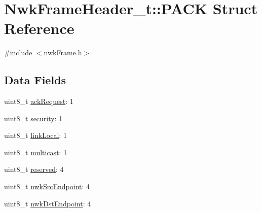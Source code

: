 \hypertarget{struct_nwk_frame_header__t_1_1_p_a_c_k}{\section{Nwk\-Frame\-Header\-\_\-t\-:\-:P\-A\-C\-K Struct Reference}
\label{struct_nwk_frame_header__t_1_1_p_a_c_k}
}


{\ttfamily \#include $<$nwk\-Frame.\-h$>$}

\subsection*{Data Fields}
\begin{DoxyCompactItemize}
\item 
uint8\-\_\-t \hyperlink{struct_nwk_frame_header__t_1_1_p_a_c_k_a73ee22a0685511a45427ceafa7ed673e}{ack\-Request}\-: 1
\item 
uint8\-\_\-t \hyperlink{struct_nwk_frame_header__t_1_1_p_a_c_k_a0aa61ebeebfc3250134ff22b50ce8e0c}{security}\-: 1
\item 
uint8\-\_\-t \hyperlink{struct_nwk_frame_header__t_1_1_p_a_c_k_a541d170684ded70d57ef8bc691d0765a}{link\-Local}\-: 1
\item 
uint8\-\_\-t \hyperlink{struct_nwk_frame_header__t_1_1_p_a_c_k_a0e30ea53f986ac565c7e599c50e9dca2}{multicast}\-: 1
\item 
uint8\-\_\-t \hyperlink{struct_nwk_frame_header__t_1_1_p_a_c_k_aba208be46817d5bbc1bd29b970937249}{reserved}\-: 4
\item 
uint8\-\_\-t \hyperlink{struct_nwk_frame_header__t_1_1_p_a_c_k_a5aef4ba0418253c9cd3873808dac10a1}{nwk\-Src\-Endpoint}\-: 4
\item 
uint8\-\_\-t \hyperlink{struct_nwk_frame_header__t_1_1_p_a_c_k_a6ada9cf446f446dc9180b44b2dabdf98}{nwk\-Dst\-Endpoint}\-: 4
\end{DoxyCompactItemize}


